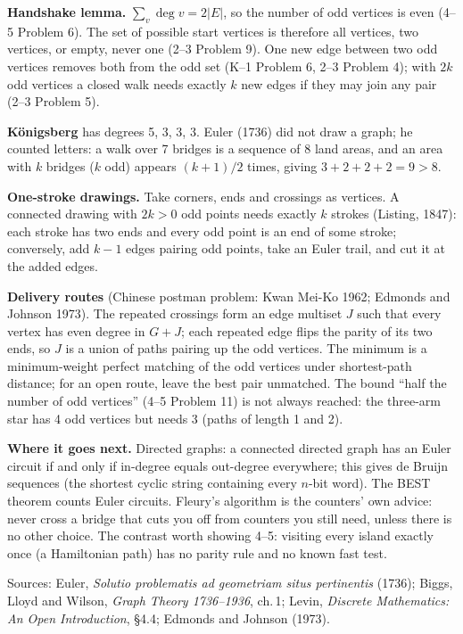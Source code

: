 \documentclass[10pt]{article}
\begin{document}
\textbf{Handshake lemma.} $\sum_v \deg v = 2|E|$, so the number of odd vertices is even (4--5 Problem 6). The set of possible start vertices is therefore all vertices, two vertices, or empty, never one (2--3 Problem 9). One new edge between two odd vertices removes both from the odd set (K--1 Problem 6, 2--3 Problem 4); with $2k$ odd vertices a closed walk needs exactly $k$ new edges if they may join any pair (2--3 Problem 5).

\textbf{Königsberg} has degrees 5, 3, 3, 3. Euler (1736) did not draw a graph; he counted letters: a walk over 7 bridges is a sequence of 8 land areas, and an area with $k$ bridges ($k$ odd) appears $(k+1)/2$ times, giving $3+2+2+2=9>8$.

\textbf{One-stroke drawings.} Take corners, ends and crossings as vertices. A connected drawing with $2k>0$ odd points needs exactly $k$ strokes (Listing, 1847): each stroke has two ends and every odd point is an end of some stroke; conversely, add $k-1$ edges pairing odd points, take an Euler trail, and cut it at the added edges.

\textbf{Delivery routes} (Chinese postman problem: Kwan Mei-Ko 1962; Edmonds and Johnson 1973). The repeated crossings form an edge multiset $J$ such that every vertex has even degree in $G+J$; each repeated edge flips the parity of its two ends, so $J$ is a union of paths pairing up the odd vertices. The minimum is a minimum-weight perfect matching of the odd vertices under shortest-path distance; for an open route, leave the best pair unmatched. The bound ``half the number of odd vertices'' (4--5 Problem 11) is not always reached: the three-arm star has 4 odd vertices but needs 3 (paths of length 1 and 2).

\textbf{Where it goes next.} Directed graphs: a connected directed graph has an Euler circuit if and only if in-degree equals out-degree everywhere; this gives de Bruijn sequences (the shortest cyclic string containing every $n$-bit word). The BEST theorem counts Euler circuits. Fleury's algorithm is the counters' own advice: never cross a bridge that cuts you off from counters you still need, unless there is no other choice. The contrast worth showing 4--5: visiting every island exactly once (a Hamiltonian path) has no parity rule and no known fast test.

Sources: Euler, \emph{Solutio problematis ad geometriam situs pertinentis} (1736); Biggs, Lloyd and Wilson, \emph{Graph Theory 1736--1936}, ch.\,1; Levin, \emph{Discrete Mathematics: An Open Introduction}, \S4.4; Edmonds and Johnson (1973).
\end{document}
